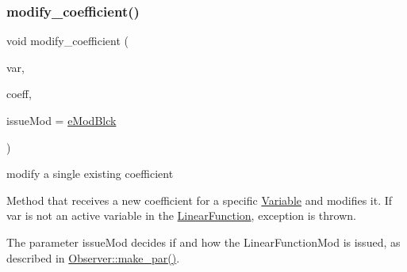 \subsubsection{\texorpdfstring{modify\+\_\+coefficient()}{modify\_coefficient()}}
{\footnotesize\ttfamily void modify\+\_\+coefficient (\begin{DoxyParamCaption}\item[{\mbox{\hyperlink{class_s_m_spp__di__unipi__it_1_1_col_variable}{Col\+Variable}} $\ast$const}]{var,  }\item[{const \mbox{\hyperlink{class_s_m_spp__di__unipi__it_1_1_linear_function_a1fa0f848dbb8d52dc62a1adfee1a1f90}{Coefficient}}}]{coeff,  }\item[{\mbox{\hyperlink{group___modification___t_y_p_e_s_ga544246d8c462e9a2d817c2c30797968f}{c\+\_\+\+Mod\+Param}}}]{issue\+Mod = {\ttfamily \mbox{\hyperlink{group___modification___t_y_p_e_s_gga48fddcdd03a03f49b7e389ca1ed938d4a21b14b26b1c0093a0905f6fc010bad29}{e\+Mod\+Blck}}} }\end{DoxyParamCaption})}



modify a single existing coefficient 

Method that receives a new coefficient for a specific \mbox{\hyperlink{class_s_m_spp__di__unipi__it_1_1_variable}{Variable}} and modifies it. If var is not an active variable in the \mbox{\hyperlink{class_s_m_spp__di__unipi__it_1_1_linear_function}{Linear\+Function}}, exception is thrown.

The parameter issue\+Mod decides if and how the Linear\+Function\+Mod is issued, as described in \mbox{\hyperlink{class_s_m_spp__di__unipi__it_1_1_observer_a2d499ae38e5e95cf66cd71da32b0694a}{Observer\+::make\+\_\+par()}}. \mbox{\label{class_s_m_spp__di__unipi__it_1_1_linear_function_a1a7d2a213864f8140442238c988f2511}} 
